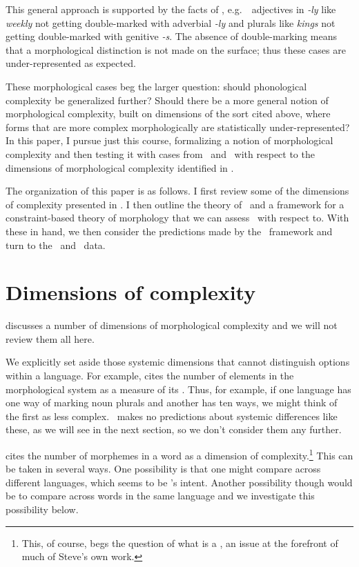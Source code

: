 \documentclass[output=paper,
modfonts
]{LSP/langsci}
\begin{document}
This general approach is supported by the facts of , e.g.\ \e\ adjectives in \emph{-ly} like \emph{weekly} not getting double-marked with adverbial \emph{-ly} and plurals like \emph{kings} not getting double-marked with genitive \emph{-s}. The absence of double-marking means that a morphological distinction is not made on the surface; thus these cases are under-represented as expected.

These morphological cases beg the larger question: should phonological complexity be generalized further? Should there be a more general notion of morphological complexity, built on dimensions of the sort cited above, where forms that are more complex morphologically are statistically under-represented? In this paper, I pursue just this course, formalizing a notion of morphological complexity and then testing it with cases from \e\ and \w\ with respect to the dimensions of morphological complexity identified in \cite{dimensions}.

The organization of this paper is as follows. I first review some of the dimensions of complexity presented in \citet{dimensions}. I then outline the theory of \io\ and a framework for a constraint-based theory of morphology that we can assess \io\ with respect to. With these in hand, we then consider the predictions made by the \io\ framework and turn to the \e\ and \w\ data.

\section{Dimensions of complexity}

\citet{dimensions} discusses a number of dimensions of morphological complexity and we will not review them all here.

We explicitly set aside those systemic dimensions that cannot distinguish options within a language. For example, \citeauthor{dimensions} cites the number of elements in the morphological system as a measure of its . Thus, for example, if one language has one way of marking noun plurals and another has ten ways, we might think of the first as less complex. \io\ makes no predictions about systemic differences like these, as we will see in the next section, so we don't consider them any further.

\citeauthor{dimensions} cites the number of morphemes in a word as a dimension of complexity.\footnote{This, of course, begs the question of what is a , an issue at the forefront of much of Steve's own work.} This can be taken in several ways. One possibility is that one might compare across different languages, which seems to be \citeauthor{dimensions}'s intent. Another possibility though would be to compare across words in the same language and we investigate this possibility below.
\end{document}
